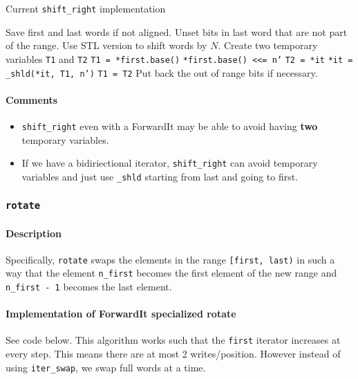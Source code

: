 \documentclass[letterpaper, 8pt]{article}
\begin{document}
\begin{algorithm}[H]
    \caption{Current \texttt{shift\_right} implementation}
    \begin{algorithmic}[1]
            \State Save first and last words if not aligned.
            \State Unset bits in last word that are not part of 
            the range.
            \State Use STL version to shift words by $N$.
            \State Create two temporary variables \texttt{T1} and \texttt{T2}
            \State \texttt{T1 = *first.base()}
            \State \texttt{*first.base() <<= n'}
                \State \texttt{T2 = *it}
                \State \texttt{*it = \_shld(*it, T1, n')}
                \State \texttt{T1 = T2}
            \EndFor
            \State Put back the out of range bits if necessary.
        \EndFunction
    \end{algorithmic}
\end{algorithm}

\paragraph{Comments}
\begin{itemize}
    \item \texttt{shift\_right} even with a ForwardIt may be able to avoid
        having \textbf{two} temporary variables.
    \item If we have a bidiriectional iterator, \texttt{shift\_right} 
        can avoid temporary variables and just use \texttt{\_shld} starting 
        from last and going to first.
\end{itemize}

\subsubsection{\texttt{rotate}}
\label{subsubsec:rotate}
\paragraph{Description}
Specifically, \texttt{rotate} swaps the elements in the range 
\texttt{[first, last)} in such a way that the element \texttt{n\_first} 
becomes the first element of the new range and \texttt{n\_first - 1} becomes 
the last element.

\paragraph{Implementation of ForwardIt specialized rotate}
See code below. This algorithm works such that the \texttt{first} iterator
increases at every step. This means there are at most 2 writes/position. However
instead of using \texttt{iter\_swap}, we swap full words at a time.\\
\end{document}
